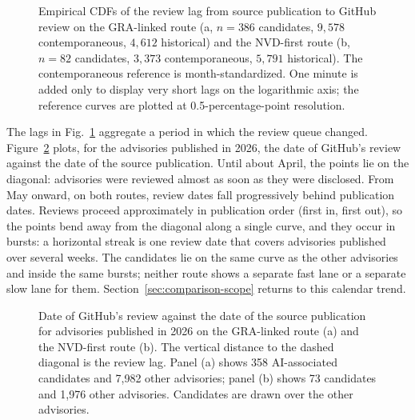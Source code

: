 \documentclass[smallextended,natbib]{svjour3}
\begin{document}
\begin{figure}[t]
\centering

\caption{Empirical CDFs of the review lag from source publication to GitHub
review on the GRA-linked route (a, $n=386$ candidates, $9{,}578$
contemporaneous, $4{,}612$ historical) and the NVD-first route (b, $n=82$
candidates, $3{,}373$ contemporaneous, $5{,}791$ historical).  The
contemporaneous reference is month-standardized.  One minute is added only to
display very short lags on the logarithmic axis; the reference curves are
plotted at 0.5-percentage-point resolution.}
\label{fig:review-cdfs}
\end{figure}

The lags in Fig.~\ref{fig:review-cdfs} aggregate a period in which the review
queue changed.  Figure~\ref{fig:review-order} plots, for the advisories
published in 2026, the date of GitHub's review against the date of the source
publication.  Until about April, the points lie on the diagonal: advisories were
reviewed almost as soon as they were disclosed.  From May onward, on both
routes, review dates fall progressively behind publication dates.  Reviews
proceed approximately in publication order (first in, first out), so the points
bend away from the diagonal along a single curve, and they occur in bursts: a
horizontal streak is one review date that covers advisories published over
several weeks.  The candidates lie on the same curve as the other advisories and
inside the same bursts; neither route shows a separate fast lane or a separate
slow lane for them.  Section~\ref{sec:comparison-scope} returns to this
calendar trend.

\begin{figure}[t]
\centering

\caption{Date of GitHub's review against the date of the source publication
for advisories published in 2026 on the GRA-linked route (a) and the NVD-first
route (b).  The vertical distance to the dashed diagonal is the review lag.
Panel (a) shows 358 AI-associated candidates and 7{,}982 other advisories;
panel (b) shows 73 candidates and 1{,}976 other advisories.  Candidates are
drawn over the other advisories. } %
\label{fig:review-order}
\end{figure}
\end{document}
